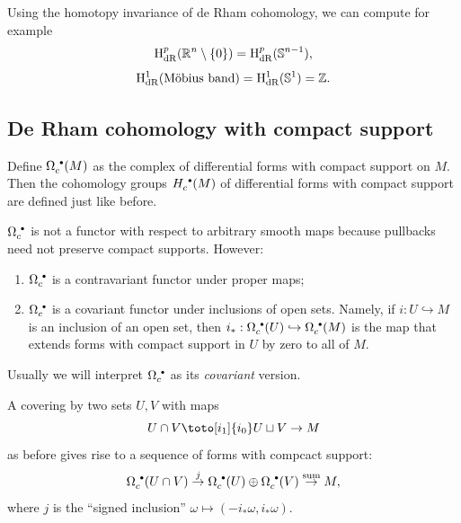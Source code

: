 \begin{xca}
    Using the homotopy invariance of de Rham cohomology, we can compute for example
    \[\mathrm{H}^p_{\rm dR}(\mathbb{R}^n\setminus\{0\})=\mathrm{H}^p_{\rm dR}(\mathbb{S}^{n-1}),\]
    \[\mathrm{H}^1_{\rm dR}(\text{M\"obius band})=\mathrm{H}^1_{\rm dR}(\mathbb{S}^1)=\mathbb{Z}.\]
\end{xca}

\subsection{De Rham cohomology with compact support}

\begin{defn}
    Define $\Omega_c^{\smbullet }(M)$ as the complex of differential forms with compact support on $M$. Then the cohomology groups $H_c^{\smbullet }(M)$ of differential forms with compact support are defined just like before.
\end{defn}

\begin{prop}
    $\Omega_c^{\smbullet }$ is not a functor with respect to arbitrary smooth maps because pullbacks need not preserve compact supports. However:
    \begin{enumerate}
        \item $\Omega_c^{\smbullet }$ is a contravariant functor under proper maps;
        \item $\Omega_c^{\smbullet }$ is a covariant functor under inclusions of open sets. Namely, if $i:U\hookrightarrow M$ is an inclusion of an open set, then $i_\ast:\Omega_c^{\smbullet }(U)\hookrightarrow\Omega_c^{\smbullet }(M)$ is the map that extends forms with compact support in $U$ by zero to all of $M$.
    \end{enumerate}
\end{prop}
Usually we will interpret $\Omega_c^{\smbullet }$ as its \emph{covariant} version.

A covering by two sets $U,V$ with maps 
\[U\cap V\toto[i_1]{i_0}U\sqcup V\to M \]
as before gives rise to a sequence of forms with compcact support:
\[\Omega_c^{\smbullet }(U\cap V)\overset{j}{\to} \Omega_c^{\smbullet }(U)\oplus\Omega_c^{\smbullet }(V)\overset{\text{sum}}\to M ,\]
where $j$ is the ``signed inclusion'' $\omega\mapsto (-i_\ast \omega,i_\ast\omega)$.


